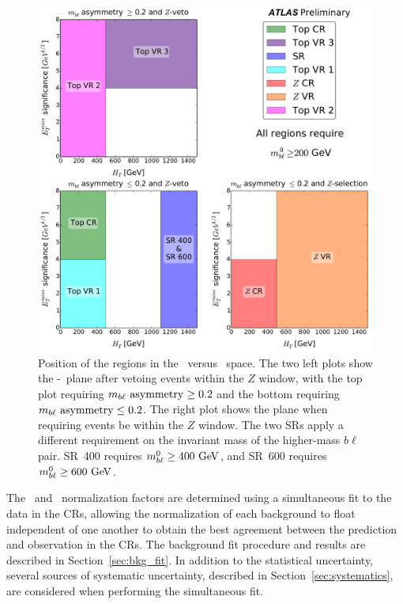 \begin{figure}[ht]
  \centering
  \includegraphics[width=\textwidth]{figs/blstop/regions__met_sig__ht_plane.pdf}
  \caption{
    Position of the regions in the \METSIG\ versus \HT\ space.
    The two left plots show the \METSIG-\HT~plane after vetoing events within
    the $Z$ window, with the top plot requiring $m_{b\ell}~\mathrm{asymmetry} \geq 0.2$ and the
    bottom requiring $m_{b\ell}~\mathrm{asymmetry} \leq 0.2$.
    The right plot shows the plane when requiring events be within the $Z$
    window.
    The two SRs apply a different requirement on the
    invariant mass of the higher-mass $b\ell$ pair. SR~400 requires
    $\MBL^{0} \geq 400 \GeV$, and SR~600 requires $\MBL^{0} \geq 600 \GeV$.
  }
  \label{fig:region_coverage}
\end{figure}

The \TTBAR\ and \ZGAMMAJETS\ normalization factors are determined using a
simultaneous fit to the data in the CRs, allowing the normalization of each
background to float independent of one another to obtain the best agreement
between the prediction and observation in the CRs.
The background fit procedure and results are described in
Section~\ref{sec:bkg_fit}.
In addition to the statistical uncertainty, several sources of systematic
uncertainty, described in Section~\ref{sec:systematics}, are considered when
performing the simultaneous fit.


